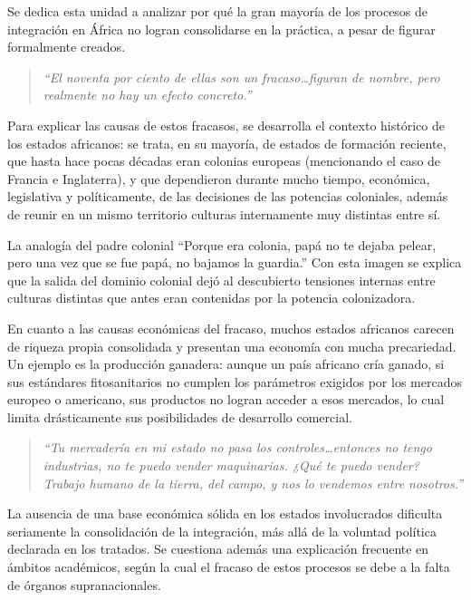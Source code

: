 \documentclass[12pt,oneside]{book}
\newenvironment{citadocente}
  {\begin{quote}\itshape\RaggedRight}
  {\end{quote}}
\begin{document}
Se dedica esta unidad a analizar por qué la gran mayoría de los procesos de integración en África no logran consolidarse en la práctica, a pesar de figurar formalmente creados.

\begin{citadocente}
``El noventa por ciento de ellas son un fracaso\ldots figuran de nombre, pero realmente no hay un efecto concreto.''
\end{citadocente}

Para explicar las causas de estos fracasos, se desarrolla el contexto histórico de los estados africanos: se trata, en su mayoría, de estados de formación reciente, que hasta hace pocas décadas eran colonias europeas (mencionando el caso de Francia e Inglaterra), y que dependieron durante mucho tiempo, económica, legislativa y políticamente, de las decisiones de las potencias coloniales, además de reunir en un mismo territorio culturas internamente muy distintas entre sí.

\begin{example}{La analogía del padre colonial}
``Porque era colonia, papá no te dejaba pelear, pero una vez que se fue papá, no bajamos la guardia.'' Con esta imagen se explica que la salida del dominio colonial dejó al descubierto tensiones internas entre culturas distintas que antes eran contenidas por la potencia colonizadora.
\end{example}

En cuanto a las causas económicas del fracaso, muchos estados africanos carecen de riqueza propia consolidada y presentan una economía con mucha precariedad. Un ejemplo es la producción ganadera: aunque un país africano cría ganado, si sus estándares fitosanitarios no cumplen los parámetros exigidos por los mercados europeo o americano, sus productos no logran acceder a esos mercados, lo cual limita drásticamente sus posibilidades de desarrollo comercial.

\begin{citadocente}
``Tu mercadería en mi estado no pasa los controles\ldots entonces no tengo industrias, no te puedo vender maquinarias. ¿Qué te puedo vender? Trabajo humano de la tierra, del campo, y nos lo vendemos entre nosotros.''
\end{citadocente}

La ausencia de una base económica sólida en los estados involucrados dificulta seriamente la consolidación de la integración, más allá de la voluntad política declarada en los tratados. Se cuestiona además una explicación frecuente en ámbitos académicos, según la cual el fracaso de estos procesos se debe a la falta de órganos supranacionales.
\end{document}
